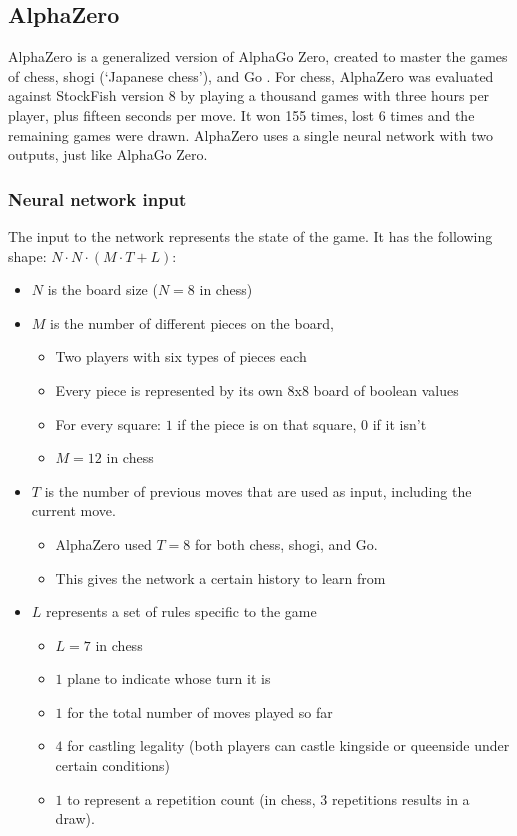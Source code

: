 \documentclass{article}
\begin{document}
\subsection{AlphaZero}

AlphaZero is a generalized version of AlphaGo Zero, created to master the games of chess, shogi (`Japanese chess'), and Go \cite{AlphaZero2022, silverMasteringChessShogi2017a}. 
For chess, AlphaZero was evaluated against StockFish version 8 by playing a thousand games with three hours per player, plus 
fifteen seconds per move. It won 155 times, lost 6 times and the remaining games were drawn. 
AlphaZero uses a single neural network with two outputs, just like AlphaGo Zero. 


\subsubsection{Neural network input}

The input to the network represents the state of the game. 
It has the following shape: $N \cdot N \cdot (M \cdot T + L)$:

\begin{itemize}
    \item $N$ is the board size ($N = 8$ in chess)
    \item $M$ is the number of different pieces on the board, 
    \begin{itemize}
        \item Two players with six types of pieces each
        \item Every piece is represented by its own 8x8 board of boolean values
        \item For every square: $1$ if the piece is on that square, $0$ if it isn't
        \item $M = 12$ in chess
    \end{itemize}
    \item $T$ is the number of previous moves that are used as input, including the current move. 
    \begin{itemize}
        \item AlphaZero used $T = 8$ for both chess, shogi, and Go.
        \item This gives the network a certain history to learn from
    \end{itemize}
    \item $L$ represents a set of rules specific to the game
    \begin{itemize}
        \item $L = 7$ in chess
        \item $1$ plane to indicate whose turn it is
        \item $1$ for the total number of moves played so far
        \item $4$ for castling legality (both players can castle kingside or queenside under certain conditions)
        \item $1$ to represent a repetition count (in chess, 3 repetitions results in a draw). 
    \end{itemize}
\end{itemize}
\end{document}
